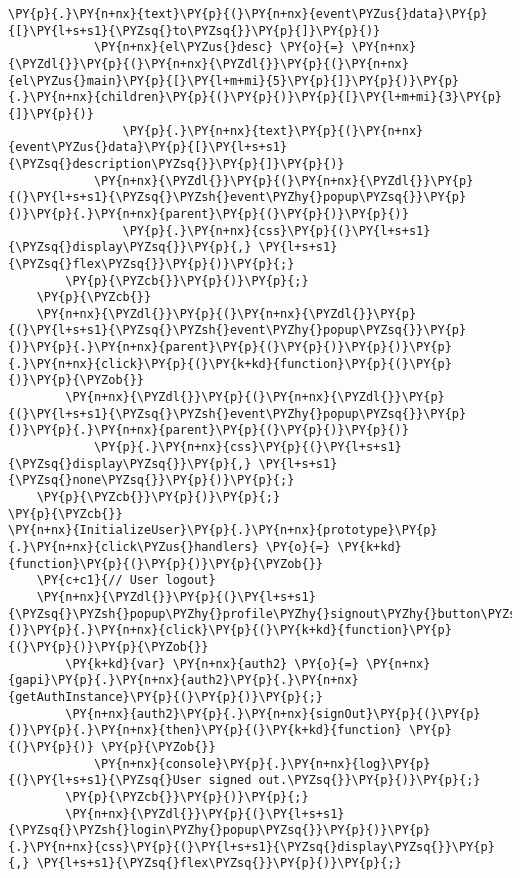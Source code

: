 \begin{Verbatim}[commandchars=\\\{\}]
                \PY{p}{.}\PY{n+nx}{text}\PY{p}{(}\PY{n+nx}{event\PYZus{}data}\PY{p}{[}\PY{l+s+s1}{\PYZsq{}to\PYZsq{}}\PY{p}{]}\PY{p}{)}
            \PY{n+nx}{el\PYZus{}desc} \PY{o}{=} \PY{n+nx}{\PYZdl{}}\PY{p}{(}\PY{n+nx}{\PYZdl{}}\PY{p}{(}\PY{n+nx}{el\PYZus{}main}\PY{p}{[}\PY{l+m+mi}{5}\PY{p}{]}\PY{p}{)}\PY{p}{.}\PY{n+nx}{children}\PY{p}{(}\PY{p}{)}\PY{p}{[}\PY{l+m+mi}{3}\PY{p}{]}\PY{p}{)}
                \PY{p}{.}\PY{n+nx}{text}\PY{p}{(}\PY{n+nx}{event\PYZus{}data}\PY{p}{[}\PY{l+s+s1}{\PYZsq{}description\PYZsq{}}\PY{p}{]}\PY{p}{)}
            \PY{n+nx}{\PYZdl{}}\PY{p}{(}\PY{n+nx}{\PYZdl{}}\PY{p}{(}\PY{l+s+s1}{\PYZsq{}\PYZsh{}event\PYZhy{}popup\PYZsq{}}\PY{p}{)}\PY{p}{.}\PY{n+nx}{parent}\PY{p}{(}\PY{p}{)}\PY{p}{)}
                \PY{p}{.}\PY{n+nx}{css}\PY{p}{(}\PY{l+s+s1}{\PYZsq{}display\PYZsq{}}\PY{p}{,} \PY{l+s+s1}{\PYZsq{}flex\PYZsq{}}\PY{p}{)}\PY{p}{;}
        \PY{p}{\PYZcb{}}\PY{p}{)}\PY{p}{;}
    \PY{p}{\PYZcb{}}
    \PY{n+nx}{\PYZdl{}}\PY{p}{(}\PY{n+nx}{\PYZdl{}}\PY{p}{(}\PY{l+s+s1}{\PYZsq{}\PYZsh{}event\PYZhy{}popup\PYZsq{}}\PY{p}{)}\PY{p}{.}\PY{n+nx}{parent}\PY{p}{(}\PY{p}{)}\PY{p}{)}\PY{p}{.}\PY{n+nx}{click}\PY{p}{(}\PY{k+kd}{function}\PY{p}{(}\PY{p}{)}\PY{p}{\PYZob{}}
        \PY{n+nx}{\PYZdl{}}\PY{p}{(}\PY{n+nx}{\PYZdl{}}\PY{p}{(}\PY{l+s+s1}{\PYZsq{}\PYZsh{}event\PYZhy{}popup\PYZsq{}}\PY{p}{)}\PY{p}{.}\PY{n+nx}{parent}\PY{p}{(}\PY{p}{)}\PY{p}{)}
            \PY{p}{.}\PY{n+nx}{css}\PY{p}{(}\PY{l+s+s1}{\PYZsq{}display\PYZsq{}}\PY{p}{,} \PY{l+s+s1}{\PYZsq{}none\PYZsq{}}\PY{p}{)}\PY{p}{;}
    \PY{p}{\PYZcb{}}\PY{p}{)}\PY{p}{;}
\PY{p}{\PYZcb{}}
\PY{n+nx}{InitializeUser}\PY{p}{.}\PY{n+nx}{prototype}\PY{p}{.}\PY{n+nx}{click\PYZus{}handlers} \PY{o}{=} \PY{k+kd}{function}\PY{p}{(}\PY{p}{)}\PY{p}{\PYZob{}}
    \PY{c+c1}{// User logout}
    \PY{n+nx}{\PYZdl{}}\PY{p}{(}\PY{l+s+s1}{\PYZsq{}\PYZsh{}popup\PYZhy{}profile\PYZhy{}signout\PYZhy{}button\PYZsq{}}\PY{p}{)}\PY{p}{.}\PY{n+nx}{click}\PY{p}{(}\PY{k+kd}{function}\PY{p}{(}\PY{p}{)}\PY{p}{\PYZob{}}
        \PY{k+kd}{var} \PY{n+nx}{auth2} \PY{o}{=} \PY{n+nx}{gapi}\PY{p}{.}\PY{n+nx}{auth2}\PY{p}{.}\PY{n+nx}{getAuthInstance}\PY{p}{(}\PY{p}{)}\PY{p}{;}
        \PY{n+nx}{auth2}\PY{p}{.}\PY{n+nx}{signOut}\PY{p}{(}\PY{p}{)}\PY{p}{.}\PY{n+nx}{then}\PY{p}{(}\PY{k+kd}{function} \PY{p}{(}\PY{p}{)} \PY{p}{\PYZob{}}
            \PY{n+nx}{console}\PY{p}{.}\PY{n+nx}{log}\PY{p}{(}\PY{l+s+s1}{\PYZsq{}User signed out.\PYZsq{}}\PY{p}{)}\PY{p}{;}
        \PY{p}{\PYZcb{}}\PY{p}{)}\PY{p}{;}
        \PY{n+nx}{\PYZdl{}}\PY{p}{(}\PY{l+s+s1}{\PYZsq{}\PYZsh{}login\PYZhy{}popup\PYZsq{}}\PY{p}{)}\PY{p}{.}\PY{n+nx}{css}\PY{p}{(}\PY{l+s+s1}{\PYZsq{}display\PYZsq{}}\PY{p}{,} \PY{l+s+s1}{\PYZsq{}flex\PYZsq{}}\PY{p}{)}\PY{p}{;}

\end{Verbatim}
